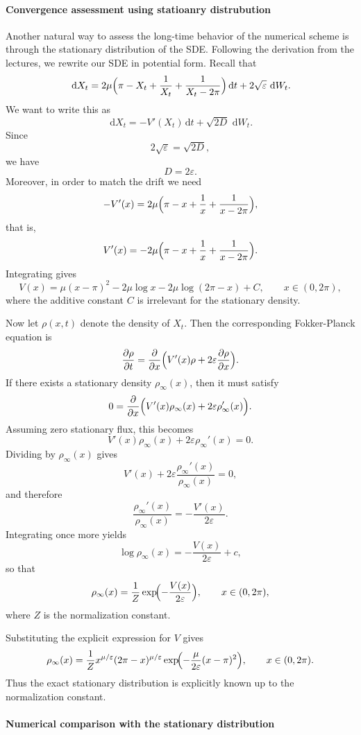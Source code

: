 \documentclass[11pt]{article}
\newcommand{\1}{\mathbbm{1}}
\newcommand{\dd}{\,\mathrm{d}}
\theoremstyle{plain}
\theoremstyle{definition}
\theoremstyle{remark}
\begin{document}
\newpage

\paragraph{Convergence assessment using statioanry distrubution}

Another natural way to assess the long-time behavior of the numerical scheme is through the stationary distribution of the SDE. Following the derivation from the lectures, we rewrite our SDE in potential form. Recall that
\[
\dd X_t
=
2\mu\Bigl(\pi-X_t+\frac{1}{X_t}+\frac{1}{X_t-2\pi}\Bigr)\dd t
+
2\sqrt{\varepsilon}\,\dd W_t.
\]
We want to write this as
\[
\dd X_t=-V'(X_t)\dd t+\sqrt{2D}\,\dd W_t.
\]
Since
\[
2\sqrt{\varepsilon}=\sqrt{2D},
\]
we have
\[
D=2\varepsilon.
\]
Moreover, in order to match the drift we need
\[
-V'(x)=2\mu\Bigl(\pi-x+\frac{1}{x}+\frac{1}{x-2\pi}\Bigr),
\]
that is,
\[
V'(x)=-2\mu\Bigl(\pi-x+\frac{1}{x}+\frac{1}{x-2\pi}\Bigr).
\]
Integrating gives
\[
V(x)
=
\mu(x-\pi)^2-2\mu\log x-2\mu\log(2\pi-x)+C,
\qquad x\in(0,2\pi),
\]
where the additive constant $C$ is irrelevant for the stationary density.

Now let $\rho(x,t)$ denote the density of $X_t$. Then the corresponding Fokker-Planck equation is
\[
\frac{\partial \rho}{\partial t}
=
\frac{\partial}{\partial x}
\Bigl(
V'(x)\rho+2\varepsilon \frac{\partial \rho}{\partial x}
\Bigr).
\]
If there exists a stationary density $\rho_\infty(x)$, then it must satisfy
\[
0=
\frac{\partial}{\partial x}
\Bigl(
V'(x)\rho_\infty(x)+2\varepsilon \rho_\infty'(x)
\Bigr).
\]
Assuming zero stationary flux, this becomes
\[
V'(x)\rho_\infty(x)+2\varepsilon \rho_\infty'(x)=0.
\]
Dividing by $\rho_\infty(x)$ gives
\[
V'(x)+2\varepsilon \frac{\rho_\infty'(x)}{\rho_\infty(x)}=0,
\]
and therefore
\[
\frac{\rho_\infty'(x)}{\rho_\infty(x)}
=
-\frac{V'(x)}{2\varepsilon}.
\]
Integrating once more yields
\[
\log \rho_\infty(x)
=
-\frac{V(x)}{2\varepsilon}+c,
\]
so that
\[
\rho_\infty(x)
=
\frac{1}{Z}\exp\!\Bigl(-\frac{V(x)}{2\varepsilon}\Bigr),
\qquad x\in(0,2\pi),
\]
where $Z$ is the normalization constant.

Substituting the explicit expression for $V$ gives
\[
\rho_\infty(x)
=
\frac{1}{Z}
x^{\mu/\varepsilon}(2\pi-x)^{\mu/\varepsilon}
\exp\!\Bigl(-\frac{\mu}{2\varepsilon}(x-\pi)^2\Bigr),
\qquad x\in(0,2\pi).
\]
Thus the exact stationary distribution is explicitly known up to the normalization constant.

\paragraph{Numerical comparison with the stationary distribution}
\end{document}
